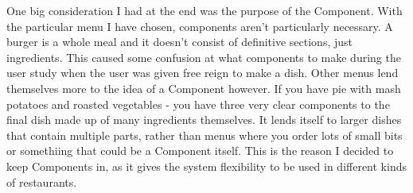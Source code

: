 One big consideration I had at the end was the purpose of the Component. With the particular menu I have chosen, components aren't particularly necessary. A burger is a whole meal and it doesn't consist of definitive sections, just ingredients. This caused some confusion at what components to make during the user study when the user was given free reign to make a dish.  Other menus lend themselves more to the idea of a Component however. If you have pie with mash potatoes and roasted vegetables - you have three very clear components to the final dish made up of many ingredients themselves. It lends itself to larger dishes that contain multiple parts, rather than menus where you order lots of small bits or somethiing that could be a Component itself. This is the reason I decided to keep Components in, as it gives the system flexibility to be used in different kinds of restaurants.

